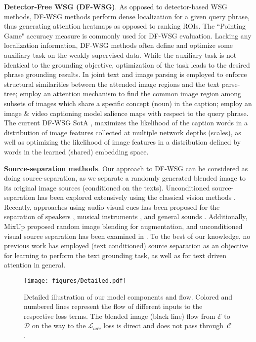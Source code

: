 \documentclass[10pt,twocolumn,letterpaper]{article}
\def\ourstask{DF-WSG}
\newcommand\secvspace{\vspace{-0.0cm}}
\newcommand\figvspace{\vspace{-0.2cm}}
\begin{document}
\noindent\textbf{Detector-Free WSG (\ourstask)}.
As opposed to detector-based WSG methods, \ourstask{} methods perform dense localization for a given query phrase, thus generating attention heatmaps as opposed to ranking ROIs. The ``Pointing Game" accuracy measure \cite{zhang2016top} is commonly used for \ourstask{} evaluation. Lacking any localization information, \ourstask{} methods often define and optimize some auxiliary task on the weakly supervised data. While the auxiliary task is not identical to the grounding objective, optimization of the task leads to the desired phrase grounding results.
In \cite{xiao2017weakly} joint text and image parsing is employed to enforce structural similarities between the attended image regions and the text parse-tree;
\cite{javed2018learning} employ an attention mechanism to find the common image region among subsets of images which share a specific concept (noun) in the caption; 
\cite{zhang2018top} employ an image \& video captioning model salience maps with respect to the query phrase. 
The current \ourstask{} SotA \cite{akbari2019multi}, maximizes the likelihood of the caption words in a distribution of image features collected at multiple network depths (scales), as well as optimizing the likelihood of image features in a distribution defined by words in the learned (shared) embedding space. 


\noindent\textbf{Source-separation methods}. Our approach to \ourstask{} can be considered as doing source-separation, as we separate a randomly generated blended image to its original image sources (conditioned on the texts).  Unconditioned source-separation has been explored extensively using the classical vision methods \cite{be2008blind, gai2011blind, hyvarinen2000independent, levin2007user, levin2002learning, pham1997blind}. Recently, approaches using audio-visual cues has been proposed for the separation of speakers \cite{chao2016speaker, ephrat2018looking, lu2019audio, Owens_2018_ECCV}, musical instruments \cite{ gan2020music, gao2019co,lluis2021music, zhao2019sound, zhao2018sound}, and general sounds \cite{gao2018learning, rouditchenko2019self, xu2019recursive}. Additionally, MixUp \cite{zhang2018mixup} proposed random image blending for augmentation, and unconditioned visual source separation has been examined in \cite{gandelsman2019double,jayaram2020source,Ma_2019_ICCV, lee2018generative,   halperin2019neural,Zou_2020_CVPR, zou2021adversarial}. 
To the best of our knowledge, no previous work has employed (text conditioned) source separation as an objective for learning to perform the text grounding task, as well as for text driven attention in general.
%
 \begin{figure*}[t!]
\begin{center}
\texttt{[image: figures/Detailed.pdf]} \end{center}
   \caption{Detailed illustration of our model components and flow. Colored and numbered lines represent the flow of different inputs to the respective loss terms. The blended image (black line) flow from $\mathcal{E}$ to $\mathcal{D}$ on the way to the $\mathcal{L}_{adv}$ loss is direct and does not pass through~$\mathcal{C}$.}
\figvspace
\label{fig:model_details}
\end{figure*}
\secvspace
\end{document}
